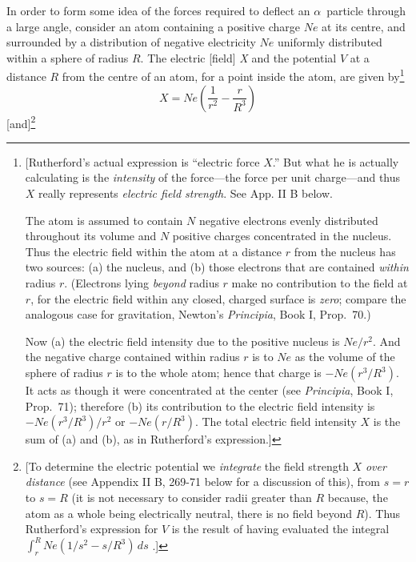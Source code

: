 In order to form some idea of the forces required to deflect an
$\alpha$~particle through a large angle, consider an atom containing a
positive charge $Ne$ at its centre, and surrounded by a
distribution of negative electricity $Ne$ uniformly distributed
within a sphere of radius $R$. The electric {[}field{]} \emph{X}
and the potential $V$ at a distance $R$ from the centre of an
atom, for a point inside the atom, are given by\footnote{{[}Rutherford's
  actual expression is ``electric force $X$.'' But what he is
  actually calculating is the \emph{intensity} of the force---the force
  per unit charge---and thus $X$ really represents \emph{electric
  field strength}. See App. II B below.
  
  The atom is assumed to contain $N$ negative electrons evenly
  distributed throughout its volume and $N$ positive charges
  concentrated in the nucleus. Thus the electric field within the atom
  at a distance $r$ from the nucleus has two sources: (a) the
  nucleus, and (b) those electrons that are contained \emph{within}
  radius $r$. (Electrons lying \emph{beyond} radius $r$ make
  no contribution to the field at $r$, for the electric field
  within any closed, charged surface is \emph{zero}; compare the
  analogous case for gravitation, Newton's \emph{Principia}, Book I,
  Prop.\ 70.)
  
  Now (a) the electric field intensity due to the positive nucleus is
  $Ne/r^2$. And the negative charge contained within radius
  $r$ is to $Ne$ as the volume of the sphere of radius
  $r$ is to the whole atom; hence that charge is
  $-Ne(r^3/R^3)$. It acts as though it were
  concentrated at the center (see \emph{Principia}, Book I, Prop.\ 71);
  therefore (b) its contribution to the electric field intensity is
  $-Ne(r^3/R^3)/r^2$ or $-Ne(r/R^3)$. The total electric field intensity
  $X$ is the sum of (a) and (b), as in Rutherford's expression.{]}}
%
\begin{equation*}
X = Ne\left(\frac{1}{r^2} - \frac{r}{R^3}\right)
\end{equation*}
%
{[}and{]}\footnote{[To determine the electric potential we
  \emph{integrate} the field strength $X$ \emph{over distance} (see
  Appendix II B, 269-71 below for a discussion of this), from $s = r$ 
  to $s = R$ (it is not necessary to consider radii
  greater than $R$ because, the atom as a whole being electrically
  neutral, there is no field beyond $R$). Thus Rutherford's
  expression for $V$ is the result of having evaluated the integral
  $\int_{r}^{R} \! Ne(1/s^2 - s/R^3)\,ds$ .]}


